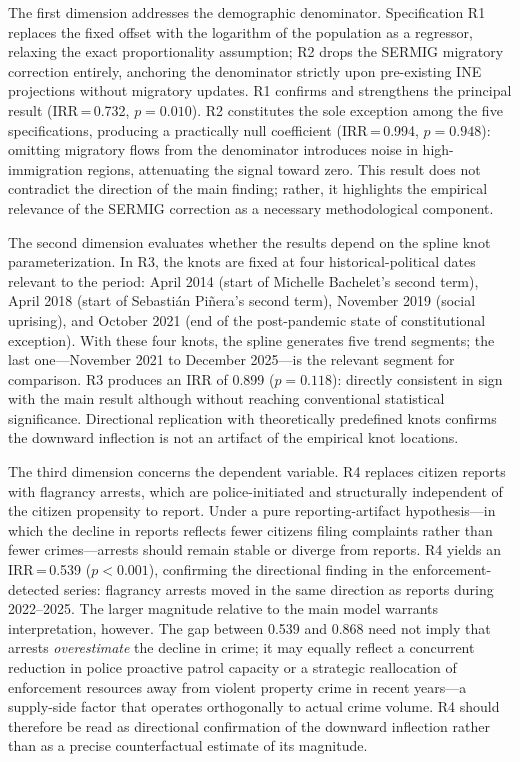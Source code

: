 \documentclass[pdflatex,sn-basic]{sn-jnl}
\begin{document}
The first dimension addresses the demographic denominator. Specification R1 replaces the fixed offset with the logarithm of the population as a regressor, relaxing the exact proportionality assumption; R2 drops the SERMIG migratory correction entirely, anchoring the denominator strictly upon pre-existing INE projections without migratory updates. R1 confirms and strengthens the principal result (IRR\,=\,0.732, $p=0.010$). R2 constitutes the sole exception among the five specifications, producing a practically null coefficient (IRR\,=\,0.994, $p=0.948$): omitting migratory flows from the denominator introduces noise in high-immigration regions, attenuating the signal toward zero. This result does not contradict the direction of the main finding; rather, it highlights the empirical relevance of the SERMIG correction as a necessary methodological component.

The second dimension evaluates whether the results depend on the spline knot parameterization. In R3, the knots are fixed at four historical-political dates relevant to the period: April 2014 (start of Michelle Bachelet's second term), April 2018 (start of Sebasti\'an Pi\~nera's second term), November 2019 (social uprising), and October 2021 (end of the post-pandemic state of constitutional exception). With these four knots, the spline generates five trend segments; the last one---November 2021 to December 2025---is the relevant segment for comparison. R3 produces an IRR of 0.899 ($p=0.118$): directly consistent in sign with the main result although without reaching conventional statistical significance. Directional replication with theoretically predefined knots confirms the downward inflection is not an artifact of the empirical knot locations.

The third dimension concerns the dependent variable. R4 replaces citizen reports with flagrancy arrests, which are police-initiated and structurally independent of the citizen propensity to report. Under a pure reporting-artifact hypothesis---in which the decline in reports reflects fewer citizens filing complaints rather than fewer crimes---arrests should remain stable or diverge from reports. R4 yields an IRR\,=\,0.539 ($p<0.001$), confirming the directional finding in the enforcement-detected series: flagrancy arrests moved in the same direction as reports during 2022--2025. The larger magnitude relative to the main model warrants interpretation, however. The gap between 0.539 and 0.868 need not imply that arrests \emph{overestimate} the decline in crime; it may equally reflect a concurrent reduction in police proactive patrol capacity or a strategic reallocation of enforcement resources away from violent property crime in recent years---a supply-side factor that operates orthogonally to actual crime volume. R4 should therefore be read as directional confirmation of the downward inflection rather than as a precise counterfactual estimate of its magnitude.
\end{document}
